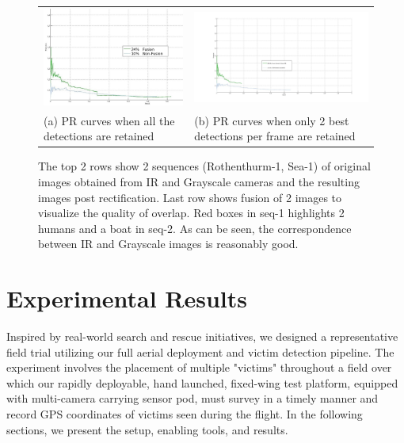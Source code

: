 \documentclass[runningheads]{llncs}
\begin{document}
\begin{figure}
  \centering
  \begin{tabular}{m{5cm}m{5cm}}
  	\includegraphics[width=6cm]{img/fusion/Roth/PR-roth-all-detections.jpg} &
  	\includegraphics[width=6cm]{img/fusion/Roth/PR-roth-top-detections.jpg} \\
  	\small (a) PR curves when all the detections are retained &
  	\small (b) PR curves when only 2 best detections per frame are retained
  \end{tabular}

  \caption{The top 2 rows show 2 sequences (Rothenthurm-1, Sea-1) of original images obtained from IR and Grayscale cameras and the resulting images post rectification. Last row shows fusion of 2 images to visualize the quality of overlap. Red boxes in seq-1 highlights 2 humans and a boat in seq-2. As can be seen, the correspondence between IR and Grayscale images is reasonably good.}\label{fig:fusion}
\end{figure}


\section{Experimental Results}

Inspired by real-world search and rescue initiatives, we designed a representative field trial utilizing our full aerial deployment and victim detection pipeline. The experiment involves the placement of multiple "victims" throughout a field over which our rapidly deployable, hand launched, fixed-wing test platform, equipped with multi-camera carrying sensor pod, must survey in a timely manner and record GPS coordinates of victims seen during the flight. In the following sections, we present the setup, enabling tools, and results.
\end{document}

